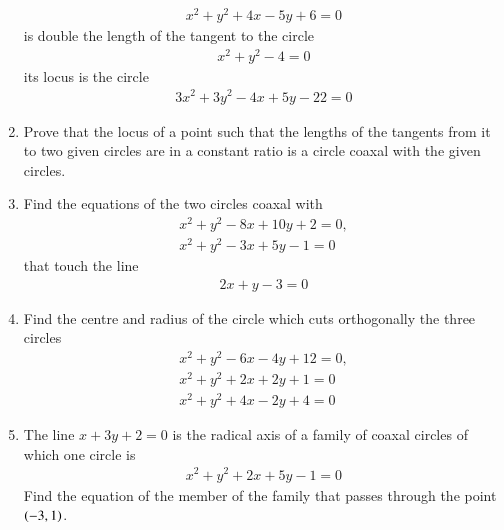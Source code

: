 \begin{enumerate}[1.]
\begin{align*}
x^2+y^2+4x-5y+6 = 0
\end{align*}
is double the length of the tangent to the circle
\begin{align*}
x^2+y^2-4 = 0
\end{align*}
its locus is the circle
\begin{align*}
3x^2+3y^2-4x+5y-22 =0
\end{align*}
\item Prove that the locus of a point such that the lengths of the tangents from it to two given circles are in a constant ratio is a circle
coaxal with the given circles.
\item Find the equations of the two circles coaxal with
\begin{align*}
x^2+y^2-8x+10y+2=0, 
\\
x^2+y^2-3x+5y - 1=0
\end{align*}
that touch the line
\begin{align*}
2x+y-3 = 0
\end{align*}
\item Find the centre and radius of the circle which cuts orthogonally the three circles
\begin{align*}
x^2+y^2-6x-4y+12=0, 
\\
x^2+y^2+2x+2y+1 = 0
\\
x^2+y^2+4x-2y+4 = 0
\end{align*}
\item The line $x+3y+2=0$ is the radical axis of a family of coaxal circles of which one circle is
\begin{align*}
x^2+y^2+2x+5y-1=0
\end{align*}
Find the equation of the member of the family that passes through the point $\left(-3,1\right)$.
\end{enumerate}
